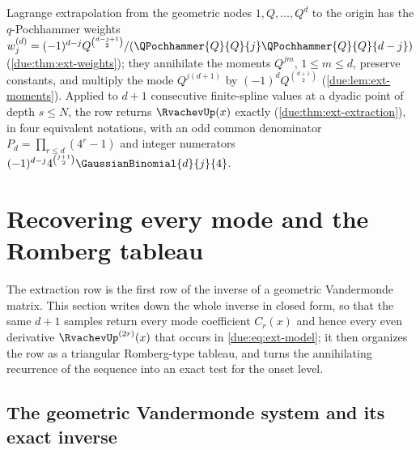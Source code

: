 \documentclass[11pt,oneside]{article}
\theoremstyle{plain}
\theoremstyle{definition}
\theoremstyle{remark}
\newcommand{\Qq}{Q}                                         %
\newcommand{\Cr}[2]{C_{#1}\!\left(#2\right)}                %
\newcommand{\Wrow}[2]{w^{(#1)}_{#2}}                        %
\begin{document}
\begin{summarybox}[title={Section summary}]
Lagrange extrapolation from the geometric nodes $1,\Qq,\ldots,\Qq^{d}$ to the
origin has the $q$-Pochhammer weights
$\Wrow{d}{j}=(-1)^{d-j}\Qq^{\binom{d-j+1}{2}}/
(\QPochhammer{\Qq}{\Qq}{j}\QPochhammer{\Qq}{\Qq}{d-j})$
(\cref{due:thm:ext-weights}); they annihilate the moments
$\Qq^{jm}$, $1\le m\le d$, preserve constants, and multiply the mode
$\Qq^{j(d+1)}$ by $(-1)^{d}\Qq^{\binom{d+1}{2}}$
(\cref{due:lem:ext-moments}).  Applied to $d+1$ consecutive finite-spline
values at a dyadic point of depth $s\le N$, the row returns $\RvachevUp(x)$
exactly (\cref{due:thm:ext-extraction}), in four equivalent notations, with
an odd common denominator $P_{d}=\prod_{r\le d}(4^{r}-1)$ and integer
numerators $(-1)^{d-j}4^{\binom{j+1}{2}}\GaussianBinomial{d}{j}{4}$.
\end{summarybox}

\section{Recovering every mode and the Romberg tableau}
\label{due:sec:recovery}

The extraction row is the first row of the inverse of a geometric Vandermonde
matrix.  This section writes down the whole inverse in closed form, so that
the same $d+1$ samples return every mode coefficient $\Cr{r}{x}$ and hence
every even derivative $\RvachevUp^{(2r)}(x)$ that occurs in
\cref{due:eq:ext-model}; it then organizes the row as a triangular
Romberg-type tableau, and turns the annihilating recurrence of the sequence
into an exact test for the onset level.

\subsection{The geometric Vandermonde system and its exact inverse}
\end{document}
